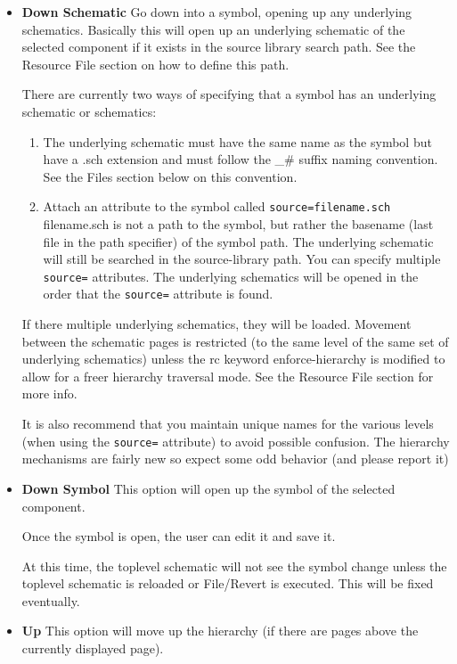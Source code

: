 \documentclass{article}
\begin{document}
\begin{itemize}
\item {\bf Down Schematic} Go down into a symbol, opening up any
  underlying schematics.  Basically this will open up an underlying
  schematic of the selected component if it exists in the source
  library search path.  See the Resource File section on how to define
  this path.
  
  There are currently two ways of specifying that a symbol has an
  underlying schematic or schematics:
  
\begin{enumerate}
\item The underlying schematic must have the same name as the symbol
  but have a .sch extension and must follow the \_\# suffix naming
  convention.  See the Files section below on this convention.
  
\item Attach an attribute to the symbol called {\tt source=filename.sch}
  filename.sch is not a path to the symbol, but rather the basename
  (last file in the path specifier) of the symbol path.  The
  underlying schematic will still be searched in the source-library
  path.  You can specify multiple {\tt source=} attributes.  The underlying
  schematics will be opened in the order that the {\tt source=} attribute is
  found.
\end{enumerate}
  If there multiple underlying schematics, they will be loaded.
  Movement between the schematic pages is restricted (to the same
  level of the same set of underlying schematics) unless the rc
  keyword enforce-hierarchy is modified to allow for a freer hierarchy
  traversal mode.  See the Resource File section for more info.
  
  It is also recommend that you maintain unique names for the various
  levels (when using the {\tt source=} attribute) to avoid possible
  confusion.  The hierarchy mechanisms are fairly new so expect some
  odd behavior (and please report it)
  
\item {\bf Down Symbol} This option will open up the symbol of the
  selected component.
  
  Once the symbol is open, the user can edit it and save it.
  
  At this time, the toplevel schematic will not see the symbol change
  unless the toplevel schematic is reloaded or File/Revert is
  executed.  This will be fixed eventually.
  
\item {\bf Up} This option will move up the hierarchy (if there are
  pages above the currently displayed page).
  

\end{itemize}
\end{document}
